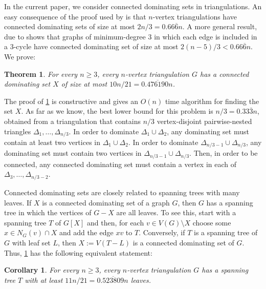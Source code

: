 \documentclass[a4paper,UKenglish,cleveref, autoref, thm-restate]{lipics-v2021}
\newtheorem{thm}{Theorem}
\newtheorem{cor}{Corollary}
\begin{document}
In the current paper, we consider connected dominating sets in triangulations.  An easy consequence of the proof used by \citet{matheson.tarjan:dominating} is that $n$-vertex triangulations have connected dominating sets of size at most $2n/3=0.66\overline{6}n$.  A more general result, due to  \citet{kleitman.west:spanning} shows that graphs of minimum-degree $3$ in which each edge is included in a $3$-cycle have connected dominating set of size at most $2(n-5)/3<0.66\overline{6}n$. We prove:

\begin{thm}\label{main_result2}
  For every $n\ge 3$, every $n$-vertex triangulation $G$ has a connected dominating set $X$ of size at most $10n/21= 0.\overline{476190}n$.
\end{thm}

The proof of \cref{main_result2} is constructive and gives an $O(n)$ time algorithm for finding the set $X$.  As far as we know, the best lower bound for this problem is $n/3 = 0.33\overline{3} n$, obtained from a triangulation that contains $n/3$ vertex-disjoint pairwise-nested triangles $\Delta_1,\ldots,\Delta_{n/3}$.  In order to dominate $\Delta_1\cup \Delta_2$, any dominating set must contain at least two vertices in $\Delta_1 \cup \Delta_2$. In order to dominate $\Delta_{n/3-1}\cup \Delta_{n/3}$, any dominating set must contain two vertices in $\Delta_{n/3-1}\cup\Delta_{n/3}$.  Then, in order to be connected, any connected dominating set must contain a vertex in each of $\Delta_3,\ldots,\Delta_{n/3-2}$.

Connected dominating sets are closely related to spanning trees with many leaves.  If $X$ is a connected dominating set of a graph $G$, then $G$ has a spanning tree in which the vertices of $G-X$ are all leaves.  To see this, start with a spanning tree $T$ of $G[X]$ and then, for each  $v\in V(G)\setminus X$ choose some $x\in N_G(v)\cap X$ and add the edge $xv$ to $T$. Conversely, if $T$ is a spanning tree of $G$ with leaf set $L$, then $X:=V(T-L)$ is a connected dominating set of $G$.  Thus, \cref{main_result2} has the following equivalent statement:

\begin{cor}\label{main_theorem_cor}
  For every $n\ge 3$, every $n$-vertex triangulation $G$ has a spanning tree $T$ with at least $11n/21= 0.\overline{523809}n$ leaves.
\end{cor}
\end{document}
